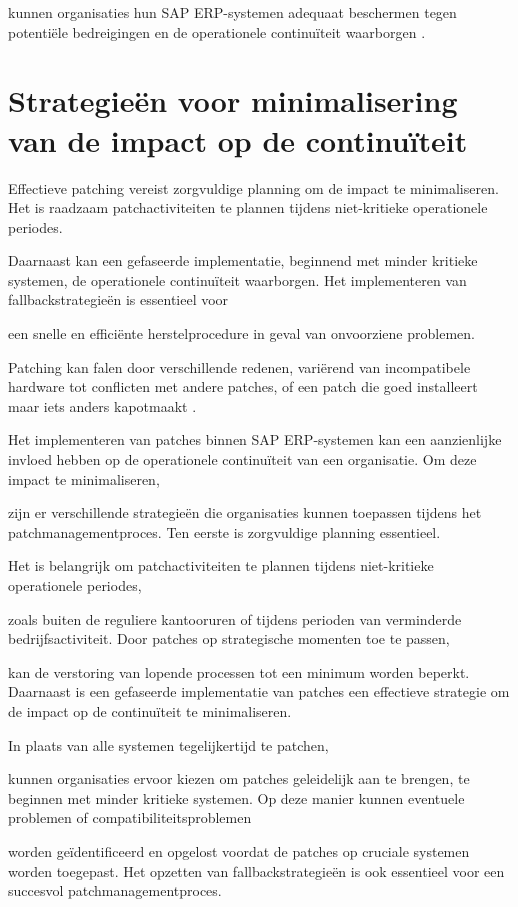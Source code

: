 kunnen organisaties hun SAP ERP-systemen adequaat beschermen tegen potentiële bedreigingen en de operationele continuïteit waarborgen \autocite{Graffeo2018}.

\section{Strategieën voor minimalisering van de impact op de continuïteit}
Effectieve patching vereist zorgvuldige planning om de impact te minimaliseren. Het is raadzaam patchactiviteiten te plannen tijdens niet-kritieke operationele periodes.

Daarnaast kan een gefaseerde implementatie, beginnend met minder kritieke systemen, de operationele continuïteit waarborgen. Het implementeren van fallbackstrategieën is essentieel voor 

een snelle en efficiënte herstelprocedure in geval van onvoorziene problemen. 

Patching kan falen door verschillende redenen, variërend van incompatibele hardware tot conflicten met andere patches, of een patch die goed installeert maar iets anders kapotmaakt \autocite{Shein2022}.

Het implementeren van patches binnen SAP ERP-systemen kan een aanzienlijke invloed hebben op de operationele continuïteit van een organisatie. Om deze impact te minimaliseren,

zijn er verschillende strategieën die organisaties kunnen toepassen tijdens het patchmanagementproces. Ten eerste is zorgvuldige planning essentieel.

Het is belangrijk om patchactiviteiten te plannen tijdens niet-kritieke operationele periodes, 

zoals buiten de reguliere kantooruren of tijdens perioden van verminderde bedrijfsactiviteit. Door patches op strategische momenten toe te passen,

kan de verstoring van lopende processen tot een minimum worden beperkt. Daarnaast is een gefaseerde implementatie van patches een effectieve strategie om de impact op de continuïteit te minimaliseren. 

In plaats van alle systemen tegelijkertijd te patchen, 

kunnen organisaties ervoor kiezen om patches geleidelijk aan te brengen, te beginnen met minder kritieke systemen. Op deze manier kunnen eventuele problemen of compatibiliteitsproblemen

worden geïdentificeerd en opgelost voordat de patches op cruciale systemen worden toegepast. Het opzetten van fallbackstrategieën is ook essentieel voor een succesvol patchmanagementproces.

